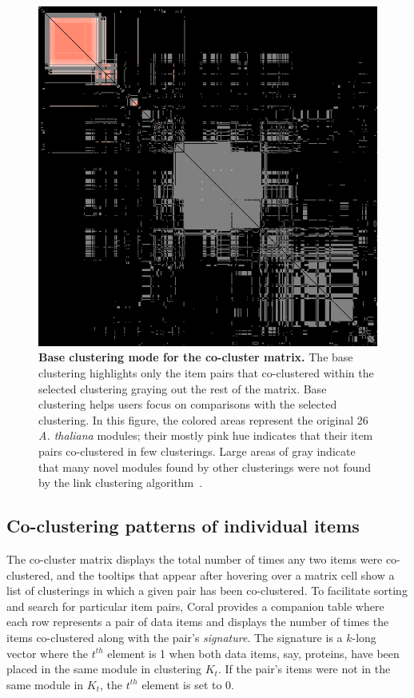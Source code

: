 \documentclass[12pt]{cmuthesis}
\newcommand\Coral{Coral\xspace}
\newcommand{\Athal}{\textit{A. thaliana}\xspace}
\begin{document}
  \begin{figure}[!htb]
    \centering
    \includegraphics[width=0.7\linewidth]{figures/coral_base_matrix}
    \caption{\textbf{Base clustering mode for the co-cluster matrix.} The base clustering highlights only the item pairs that co-clustered within the selected clustering graying out the rest of the matrix. Base clustering helps users focus on comparisons with the selected clustering. In this figure, the colored areas represent the original 26 \Athal modules; their mostly pink hue indicates that their item pairs co-clustered in few clusterings. Large areas of gray indicate that many novel modules found by other clusterings were not found by the link clustering algorithm~\cite{Ahn2010}.}
    \label{fig:coral:base_clust}
  \end{figure}

  \subsection{Co-clustering patterns of individual items}
  \label{sec:pairs_table}

  The co-cluster matrix displays the total number of times any two items were co-clustered, and the tooltips that appear after hovering over a matrix cell show a list of clusterings in which a given pair has been co-clustered. To facilitate sorting and search for particular item pairs, \Coral provides a companion table where each row represents a pair of data items and displays the number of times the items co-clustered along with the pair's \textit{signature}. The signature is a $k$-long vector where the $t^{th}$ element is 1 when both data items, say, proteins, have been placed in the same module in clustering $K_{t}$. If the pair's items were not in the same module in $K_{t}$, the $t^{th}$ element is set to 0.
\end{document}
